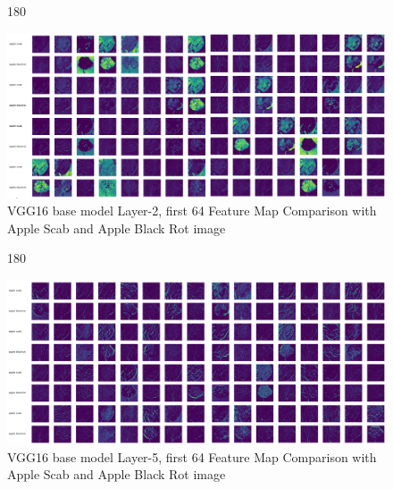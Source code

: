 \begin{figure}
    \centering
    \begin{turn}{180}
        \begin{minipage}{\linewidth}
            \centering
            \includegraphics[width=1\linewidth]{graphics//chapter7/fmap comp as abr.png}
            \caption{VGG16 base model Layer-2, first 64 Feature Map Comparison with Apple Scab and Apple Black Rot image}
            \label{fig:comp-1}
        \end{minipage}
    \end{turn}
\end{figure}


\begin{figure}
    \centering
    \begin{turn}{180}
        \begin{minipage}{\linewidth}
        \centering
        \includegraphics[width=1\linewidth]{graphics//chapter7/fmap comp abr as l5.png}
        \caption{VGG16 base model Layer-5, first 64 Feature Map Comparison with Apple Scab and Apple Black Rot image}
        \label{fig:comp-2}
        \end{minipage}
    \end{turn}
\end{figure}


